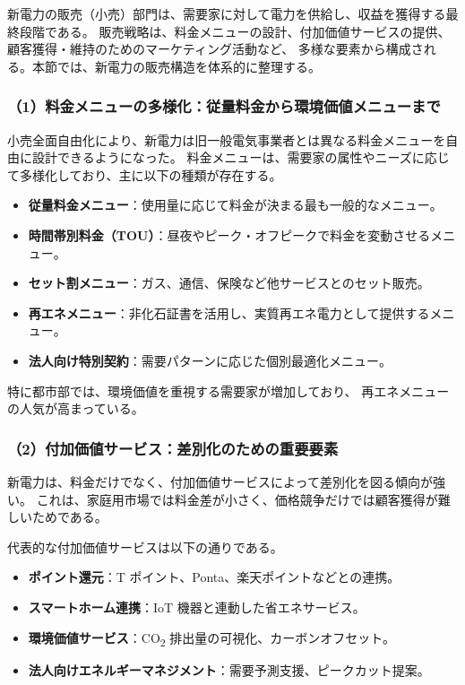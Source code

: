新電力の販売（小売）部門は、需要家に対して電力を供給し、収益を獲得する最終段階である。
販売戦略は、料金メニューの設計、付加価値サービスの提供、顧客獲得・維持のためのマーケティング活動など、
多様な要素から構成される。本節では、新電力の販売構造を体系的に整理する。

\subsubsection{（1）料金メニューの多様化：従量料金から環境価値メニューまで}

小売全面自由化により、新電力は旧一般電気事業者とは異なる料金メニューを自由に設計できるようになった。
料金メニューは、需要家の属性やニーズに応じて多様化しており、主に以下の種類が存在する。

\begin{itemize}
  \item \textbf{従量料金メニュー}：使用量に応じて料金が決まる最も一般的なメニュー。
  \item \textbf{時間帯別料金（TOU）}：昼夜やピーク・オフピークで料金を変動させるメニュー。
  \item \textbf{セット割メニュー}：ガス、通信、保険など他サービスとのセット販売。
  \item \textbf{再エネメニュー}：非化石証書を活用し、実質再エネ電力として提供するメニュー。
  \item \textbf{法人向け特別契約}：需要パターンに応じた個別最適化メニュー。
\end{itemize}

特に都市部では、環境価値を重視する需要家が増加しており、
再エネメニューの人気が高まっている。

\subsubsection{（2）付加価値サービス：差別化のための重要要素}

新電力は、料金だけでなく、付加価値サービスによって差別化を図る傾向が強い。
これは、家庭用市場では料金差が小さく、価格競争だけでは顧客獲得が難しいためである。

代表的な付加価値サービスは以下の通りである。

\begin{itemize}
  \item \textbf{ポイント還元}：T ポイント、Ponta、楽天ポイントなどとの連携。
  \item \textbf{スマートホーム連携}：IoT 機器と連動した省エネサービス。
  \item \textbf{環境価値サービス}：CO\textsubscript{2} 排出量の可視化、カーボンオフセット。
  \item \textbf{法人向けエネルギーマネジメント}：需要予測支援、ピークカット提案。
\end{itemize}

